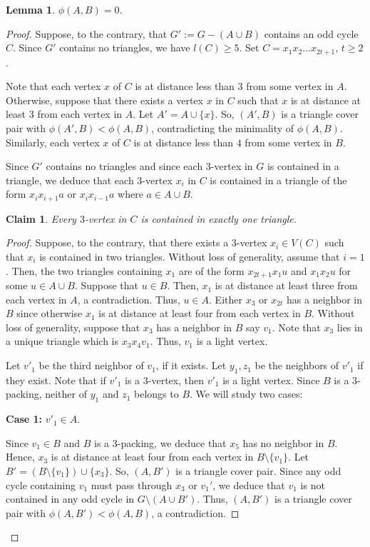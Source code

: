 \documentclass[12pt, oneside]{scrartcl}
\newtheorem{lemma}{Lemma}%
\newtheorem{claim}{Claim}[section]
\begin{document}
\begin{lemma}\label{l7}
    $\phi(A,B)=0$.
\end{lemma}
\begin{proof}
Suppose, to the contrary, that $G' := G- (A\cup B)$ contains an odd cycle $C$. Since $G'$ contains no triangles, we have $l(C) \ge 5$. Set $C = x_1 x_2 \ldots x_{2t+1}$, $t\geq 2$.  

Note that each vertex $x$ of $C$ is at distance less than 3 from some vertex in $A$. Otherwise, suppose that there exists a vertex $x$ in $C$ such that $x$ is at distance at least $3$ from each vertex in $A$. Let $A'=A\cup \{x\}$. So, $(A', B)$ is a triangle cover pair with $\phi (A',B) < \phi (A,B)$, contradicting the minimality of $\phi(A,B)$. Similarly, each vertex $x$ of $C$ is at distance less than $4$ from some vertex in $B$. 

Since $G'$ contains no triangles and since each $3$-vertex in $G$ is contained in a triangle, we deduce that each $3$-vertex $x_i$ in $C$ is contained in a triangle of the form $x_ix_{i+1}a$ or $x_ix_{i-1}a$ where $a\in A\cup B$.

\begin{claim}
    Every $3$-vertex in $C$ is contained in exactly one triangle.
\end{claim}
\begin{proof}
    Suppose, to the contrary, that there exists a $3$-vertex $x_i\in V(C)$ such that $x_i$ is contained in two triangles. Without loss of generality, assume that $i=1$. Then, the two triangles containing $x_1$ are of the form $x_{2t+1}x_1u$ and $x_1x_2u$ for some $u\in A\cup B$. Suppose that $u\in B$. Then, $x_1$ is at distance at least three from each vertex in $A$, a contradiction. Thus, $u\in A$. Either $x_3$ or $x_{2t}$ has a neighbor in $B$ since otherwise $x_1$ is at distance at least four from each vertex in $B$. Without loss of generality, suppose that $x_3$ has a neighbor in $B$ say $v_1$. Note that $x_3$ lies in a unique triangle which is $x_3x_4v_1$. Thus, $v_1$ is a light vertex.
    
    Let $v'_1$ be the third neighbor of $v_1$, if it exists. Let $y_1,z_1$ be the neighbors of $v'_1$ if they exist. Note that if $v'_1$ is a $3$-vertex, then $v'_1$ is a light vertex. Since $B$ is a $3$-packing, neither of $y_1$ and $z_1$ belongs to $B$. We will study two cases:

\medskip
\noindent
\textbf{Case 1:} $v'_1\in A$.

Since $v_1\in B$ and $B$ is a $3$-packing, we deduce that $x_5$ has no neighbor in $B$. Hence, $x_3$ is at distance at least four from each vertex in $B\setminus \{v_1\}$. Let $B'=(B\setminus \{v_1\})\cup \{x_3\}$. So, $(A,B')$ is a triangle cover pair. Since any odd cycle containing $v_1$ must pass through $x_3$ or $v_1'$, we deduce that $v_1$ is not contained in any odd cycle in $G\setminus(A\cup B')$. Thus, $(A,B')$ is a triangle cover pair with $\phi (A,B') < \phi (A,B)$, a contradiction.


\end{proof}
\end{proof}
\end{document}
